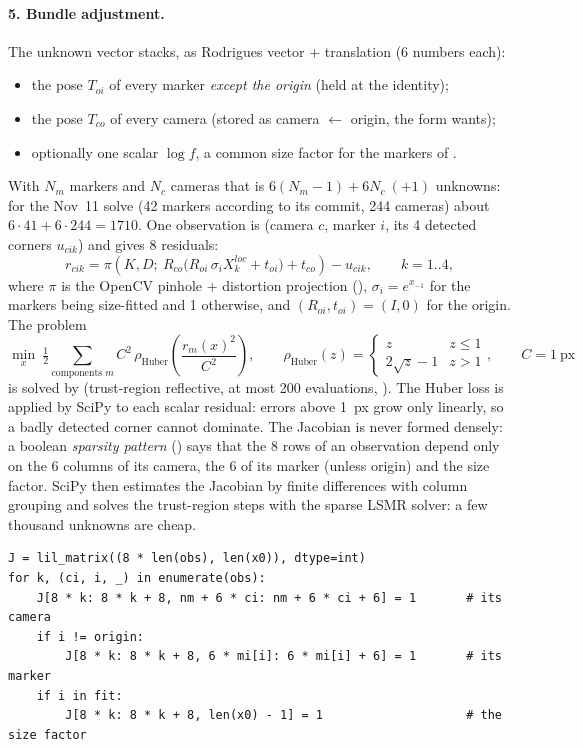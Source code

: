 \paragraph{5. Bundle adjustment.} The unknown vector stacks, as Rodrigues vector + translation (6 numbers each):
\begin{itemize}[nosep]
\item the pose $T_{oi}$ of every marker \emph{except the origin} (held at the identity);
\item the pose $T_{co}$ of every camera (stored as camera $\leftarrow$ origin, the form  wants);
\item optionally one scalar $\log f$, a common size factor for the markers of .
\end{itemize}
With $N_m$ markers and $N_c$ cameras that is $6(N_m - 1) + 6 N_c\ (+1)$ unknowns: for the Nov~11 solve
(42 markers according to its commit, 244 cameras) about $6 \cdot 41 + 6 \cdot 244 = 1710$.
One observation is (camera $c$, marker $i$, its 4 detected corners $u_{cik}$) and gives 8 residuals:
\[
r_{cik} = \pi\!\left(K, D;\ R_{co}\big(R_{oi}\, \sigma_i X^{loc}_k + t_{oi}\big) + t_{co}\right) - u_{cik},
\qquad k = 1..4,
\]
where $\pi$ is the OpenCV pinhole + distortion projection (), $\sigma_i = e^{x_{-1}}$ for
the markers being size-fitted and 1 otherwise, and $(R_{oi}, t_{oi}) = (I, 0)$ for the origin. The problem
\[
\min_x \ \tfrac12 \sum_{\text{components } m} C^2\, \rho_{\text{Huber}}\!\left(\frac{r_m(x)^2}{C^2}\right),
\qquad \rho_{\text{Huber}}(z) = \begin{cases} z & z \leq 1 \\ 2\sqrt z - 1 & z > 1 \end{cases},
\qquad C = 1\ \text{px}
\]
is solved by  (trust-region reflective, at most 200 evaluations,
). The Huber loss is applied by SciPy to each scalar residual: errors above 1~px grow only
linearly, so a badly detected corner cannot dominate. The Jacobian is never formed densely: a boolean
\emph{sparsity pattern}  () says that the 8 rows of an observation depend only on the 6
columns of its camera, the 6 of its marker (unless origin) and the size factor. SciPy then estimates the Jacobian
by finite differences with column grouping and solves the trust-region steps with the sparse LSMR solver: a few
thousand unknowns are cheap.

\begin{lstlisting}
J = lil_matrix((8 * len(obs), len(x0)), dtype=int)
for k, (ci, i, _) in enumerate(obs):
    J[8 * k: 8 * k + 8, nm + 6 * ci: nm + 6 * ci + 6] = 1       # its camera
    if i != origin:
        J[8 * k: 8 * k + 8, 6 * mi[i]: 6 * mi[i] + 6] = 1       # its marker
    if i in fit:
        J[8 * k: 8 * k + 8, len(x0) - 1] = 1                    # the size factor
\end{lstlisting}

